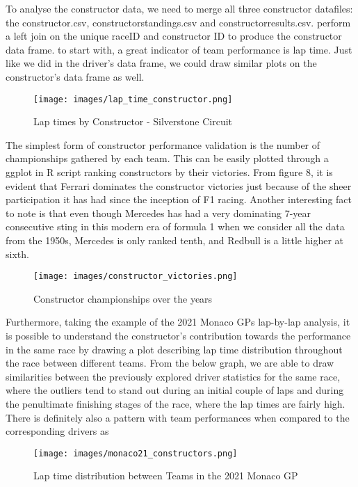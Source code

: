 \documentclass[10pt,twocolumn,letterpaper]{article}
\begin{document}
To analyse the constructor data, we need to merge all three constructor datafiles: the constructor.csv, constructorstandings.csv and constructorresults.csv. perform a left join on the unique raceID and constructor ID to produce the constructor data frame. to start with, a great indicator of team performance is lap time. Just like we did in the driver's data frame, we could draw similar plots on the constructor's data frame as well. 

\begin{figure}[h]
\centering
\texttt{[image: images/lap\_time\_constructor.png]} 
\caption{Lap times by Constructor - Silverstone Circuit}
\end{figure}

The simplest form of constructor performance validation is the number of championships gathered by each team. This can be easily plotted through a ggplot in R script ranking constructors by their victories. From figure 8, it is evident that Ferrari dominates the constructor victories just because of the sheer participation it has had since the inception of F1 racing. Another interesting fact to note is that even though Mercedes has had a very dominating 7-year consecutive sting in this modern era of formula 1 when we consider all the data from the 1950s, Mercedes is only ranked tenth, and Redbull is a little higher at sixth.

\begin{figure}[h]
\centering
\texttt{[image: images/constructor\_victories.png]} 
\caption{Constructor championships over the years}
\end{figure}

Furthermore, taking the example of the 2021 Monaco GPs lap-by-lap analysis, it is possible to understand the constructor's contribution towards the performance in the same race by drawing a plot describing lap time distribution throughout the race between different teams. From the below graph, we are able to draw similarities between the previously explored driver statistics for the same race, where the outliers tend to stand out during an initial couple of laps and during the penultimate finishing stages of the race, where the lap times are fairly high. There is definitely also a pattern with team performances when compared to the corresponding drivers as 

\begin{figure}[h]
\centering
\texttt{[image: images/monaco21\_constructors.png]} 
\caption{Lap time distribution between Teams in the 2021 Monaco GP }
\end{figure}
\end{document}
